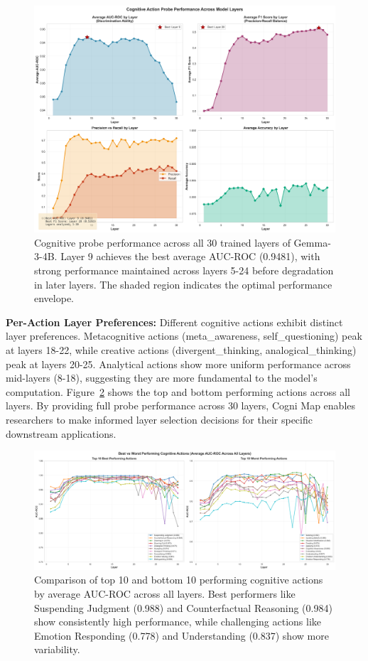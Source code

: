 \documentclass[letterpaper]{article}
\begin{document}
\begin{figure}[t]
\centering
\includegraphics[width=\textwidth]{../data/cognitive_probe_performance_by_layer.png}
\caption{Cognitive probe performance across all 30 trained layers of Gemma-3-4B. Layer 9 achieves the best average AUC-ROC (0.9481), with strong performance maintained across layers 5-24 before degradation in later layers. The shaded region indicates the optimal performance envelope.}
\label{fig:layer_performance}
\end{figure}

\textbf{Per-Action Layer Preferences:} Different cognitive actions exhibit distinct layer preferences. Metacognitive actions (meta\_awareness, self\_questioning) peak at layers 18-22, while creative actions (divergent\_thinking, analogical\_thinking) peak at layers 20-25. Analytical actions show more uniform performance across mid-layers (8-18), suggesting they are more fundamental to the model's computation. Figure~\ref{fig:best_worst} shows the top and bottom performing actions across all layers. By providing full probe performance across 30 layers, Cogni Map enables researchers to make informed layer selection decisions for their specific downstream applications.

\begin{figure}[t]
\centering
\includegraphics[width=\textwidth]{../data/best_worst_actions.png}
\caption{Comparison of top 10 and bottom 10 performing cognitive actions by average AUC-ROC across all layers. Best performers like Suspending Judgment (0.988) and Counterfactual Reasoning (0.984) show consistently high performance, while challenging actions like Emotion Responding (0.778) and Understanding (0.837) show more variability.}
\label{fig:best_worst}
\end{figure}
\end{document}
